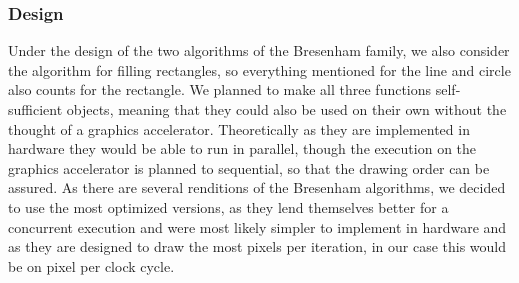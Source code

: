 \subsubsection*{Design}
Under the design of the two algorithms of the Bresenham family, we also consider the algorithm for filling rectangles, so everything mentioned for the line and circle also counts for the rectangle. We planned to make all three functions self-sufficient objects, meaning that they could also be used on their own without the thought of a graphics accelerator. Theoretically as they are implemented in hardware they would be able to run in parallel, though the execution on the graphics accelerator is planned to sequential, so that the drawing order can be assured. As there are several renditions of the Bresenham algorithms, we decided to use the most optimized versions, as they lend themselves better for a concurrent execution and were most likely simpler to implement in hardware and as they are designed to draw the most pixels per iteration, in our case this would be on pixel per clock cycle.


